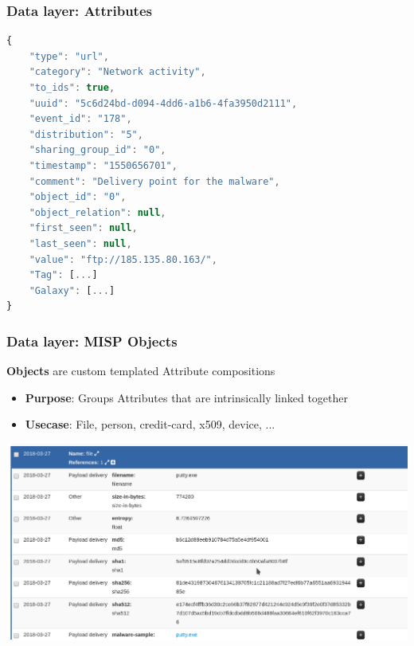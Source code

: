 \begin{frame}[fragile]
    \frametitle{Data layer: Attributes}
        \begin{lstlisting}[language=javascript,firstnumber=1]
{
    "type": "url",
    "category": "Network activity",
    "to_ids": true,
    "uuid": "5c6d24bd-d094-4dd6-a1b6-4fa3950d2111",
    "event_id": "178",
    "distribution": "5",
    "sharing_group_id": "0",
    "timestamp": "1550656701",
    "comment": "Delivery point for the malware",
    "object_id": "0",
    "object_relation": null,
    "first_seen": null,
    "last_seen": null,
    "value": "ftp://185.135.80.163/",
    "Tag": [...]
    "Galaxy": [...]
}
\end{lstlisting}
\end{frame}

\begin{frame}
    \frametitle{Data layer: MISP Objects}
        {\bf Objects} are custom templated Attribute compositions
        \begin{itemize}
            \item[] \textbf{Purpose}: Groups Attributes that are intrinsically linked together
            \item[] \textbf{Usecase}: File, person, credit-card, x509, device, ...
        \end{itemize}
        \begin{center}
            \includegraphics[width=1.0\linewidth]{object.png}
        \end{center}
\end{frame}

